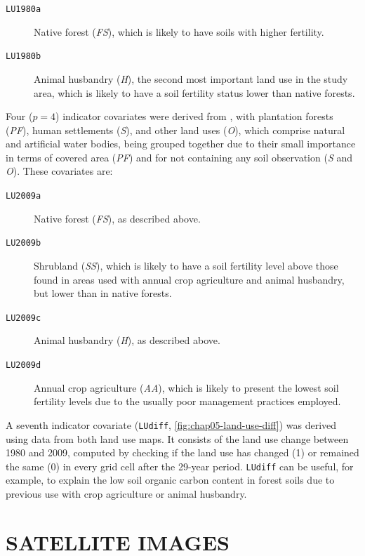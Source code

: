 \begin{description}
\item[\texttt{LU1980a}] Native forest (\textit{FS}), which is likely to have soils with higher fertility.
  
\item[\texttt{LU1980b}] Animal husbandry (\textit{H}), the second most important land use in the study area, 
which is likely to have a soil fertility status lower than native forests.
\end{description}

Four ($p = 4$) indicator covariates were derived from \landNew{}, with plantation forests (\textit{PF}), human 
settlements (\textit{S}), and other land uses (\textit{O}), which comprise natural and artificial water 
bodies, being grouped together due to their small importance in terms of covered area (\textit{PF}) and for 
not containing any soil observation (\textit{S} and \textit{O}). These covariates are:

\begin{description}
\item[\texttt{LU2009a}] Native forest (\textit{FS}), as described above.
 
\item[\texttt{LU2009b}] Shrubland (\textit{SS}), which is likely to have a soil fertility level above those 
found in areas used with annual crop agriculture and animal husbandry, but lower than in native forests.
 
\item[\texttt{LU2009c}] Animal husbandry (\textit{H}), as described above.
  
\item[\texttt{LU2009d}] Annual crop agriculture (\textit{AA}), which is likely to present the lowest soil 
fertility levels due to the usually poor management practices employed.
\end{description}

A seventh indicator covariate (\texttt{LUdiff}, \autoref{fig:chap05-land-use-diff}) was derived using data 
from both land use maps. It consists of the land use change between \num{1980} and \num{2009}, computed by 
checking if the land use has changed (1) or remained the same (0) in every grid cell after the 29-year period. 
\texttt{LUdiff} can be useful, for example, to explain the low soil organic carbon content in forest soils due 
to previous use with crop agriculture or animal husbandry.

\section{SATELLITE IMAGES}
\label{sec:chap05-sat-image}

